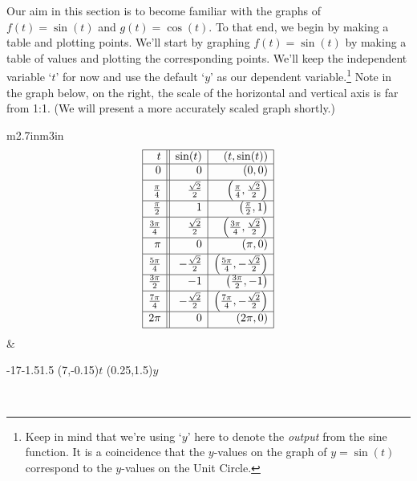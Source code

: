 \smallskip

Our aim in this section is to become familiar with the graphs of $f(t) = \sin(t)$ and $g(t) = \cos(t)$.  To that end, we begin by making a table and plotting points.  We'll start by graphing $f(t) = \sin(t)$ by making a table of values and plotting the corresponding points.  We'll keep the independent variable `$t$' for now and use the default `$y$' as our dependent variable.\footnote{Keep in mind that we're using `$y$' here to denote the \textit{output} from the sine function.  It is a coincidence that the $y$-values on the graph of $y=\sin(t)$ correspond to the $y$-values on the Unit Circle.}  Note in the graph below, on the right,  the scale of the horizontal and vertical axis is far from 1:1.  (We will present a more accurately scaled graph shortly.)


\hspace{.5in} \begin{tabular}{m{2.7in}m{3in}}
\setlength{\extrarowheight}{2pt}
\[ \begin{array}{|r||r|r|}  

\hline

 t & \sin(t) & (t,\sin(t)) \\ \hline
0  & 0 & (0, 0) \\ [2pt]   \hline
\frac{\pi}{4}  & \frac{\sqrt{2}}{2} & \left(\frac{\pi}{4}, \frac{\sqrt{2}}{2}\right) \\ [2pt] \hline 
\frac{\pi}{2}  & 1 & \left(\frac{\pi}{2}, 1\right) \\ [2pt] \hline 
\frac{3\pi}{4}  & \frac{\sqrt{2}}{2} & \left(\frac{3\pi}{4}, \frac{\sqrt{2}}{2}\right) \\ [2pt] \hline 
\pi & 0 & (\pi, 0) \\ [2pt] \hline 
\frac{5\pi}{4}  & -\frac{\sqrt{2}}{2} & \left(\frac{5\pi}{4}, -\frac{\sqrt{2}}{2}\right) \\ [2pt] \hline 
\frac{3\pi}{2}  & -1 & \left(\frac{3\pi}{2}, -1 \right) \\ [2pt] \hline 
\frac{7\pi}{4}  & -\frac{\sqrt{2}}{2} & \left(\frac{7\pi}{4}, -\frac{\sqrt{2}}{2}\right) \\ [2pt] \hline 
2\pi  & 0 & (2\pi, 0) \\  [2pt] \hline
\end{array} \] \setlength{\extrarowheight}{0pt} &

\begin{mfpic}[25][50]{-1}{7}{-1.5}{1.5}
\axes
\tlabel[cc](7,-0.15){\scriptsize $t$}
\tlabel[cc](0.25,1.5){\scriptsize $y$}
\tlpointsep{4pt}
\scriptsize
{}
\normalsize
{}
\penwd{1.1pt}
\end{mfpic} \\


\end{tabular}
